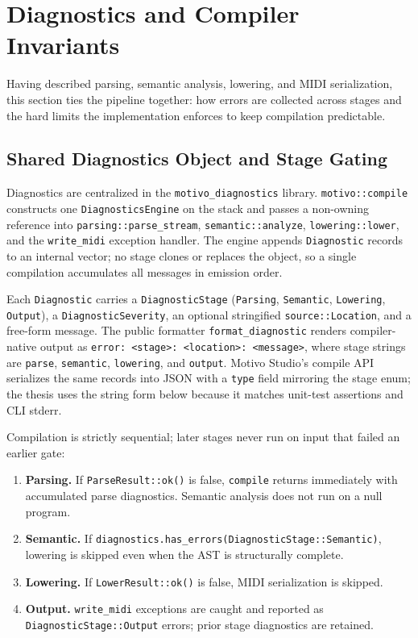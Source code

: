 \section{Diagnostics and Compiler Invariants}\label{sec:compiler-diagnostics}

Having described parsing, semantic analysis, lowering, and MIDI serialization, this section ties the pipeline together:
how errors are collected across stages and the hard limits the implementation enforces to keep compilation predictable.

\subsection{Shared Diagnostics Object and Stage Gating}\label{detail-subsec:diagnostics-architecture}

Diagnostics are centralized in the \texttt{motivo\_diagnostics} library.
\texttt{motivo::compile} constructs one \texttt{DiagnosticsEngine} on the stack and passes a non-owning reference into
\texttt{parsing::parse\_stream}, \texttt{semantic::analyze}, \texttt{lowering::lower}, and the \texttt{write\_midi}
exception handler.
The engine appends \texttt{Diagnostic} records to an internal vector; no stage clones or replaces the object, so a
single compilation accumulates all messages in emission order.

Each \texttt{Diagnostic} carries a \texttt{DiagnosticStage} (\texttt{Parsing}, \texttt{Semantic}, \texttt{Lowering},
\texttt{Output}), a \texttt{DiagnosticSeverity}, an optional stringified \texttt{source::Location}, and a free-form
message.
The public formatter \texttt{format\_diagnostic} renders compiler-native output as
\texttt{error: \textless stage\textgreater: \textless location\textgreater: \textless message\textgreater}, where
stage strings are \texttt{parse}, \texttt{semantic}, \texttt{lowering}, and \texttt{output}.
Motivo Studio's compile API serializes the same records into JSON with a \texttt{type} field mirroring the stage enum;
the thesis uses the string form below because it matches unit-test assertions and CLI stderr.

Compilation is strictly sequential; later stages never run on input that failed an earlier gate:

\begin{enumerate}
  \item \textbf{Parsing.} If \texttt{ParseResult::ok()} is false, \texttt{compile} returns immediately with accumulated
    parse diagnostics. Semantic analysis does not run on a null program.
  \item \textbf{Semantic.} If \texttt{diagnostics.has\_errors(DiagnosticStage::Semantic)}, lowering is skipped even when
    the AST is structurally complete.
  \item \textbf{Lowering.} If \texttt{LowerResult::ok()} is false, MIDI serialization is skipped.
  \item \textbf{Output.} \texttt{write\_midi} exceptions are caught and reported as \texttt{DiagnosticStage::Output}
    errors; prior stage diagnostics are retained.
\end{enumerate}

